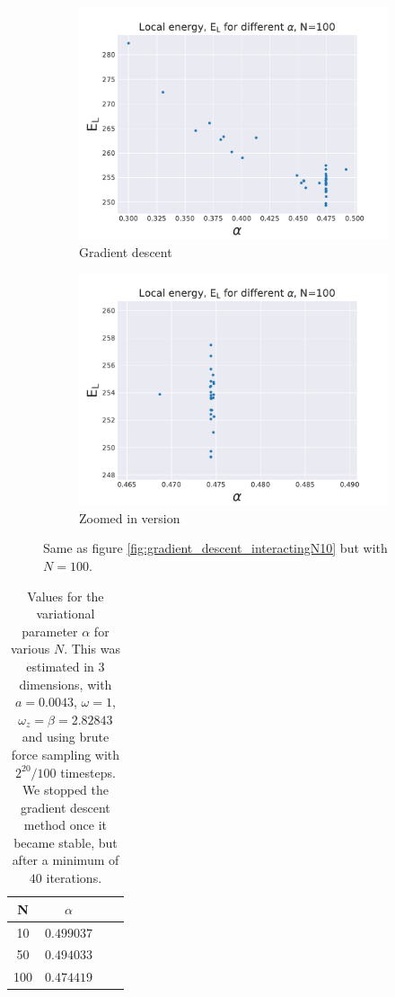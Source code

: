 \documentclass[a4paper, 10pt]{article}
\begin{document}
		\begin{figure}[ht!]
			\centering
			\centering
			\begin{subfigure}{.5\textwidth}
				\centering
				\includegraphics[width=.8\linewidth]{../Results/E_v_alpha_gradientN100.pdf}
				\caption{Gradient descent}
			\end{subfigure}%
			\begin{subfigure}{.5\textwidth}
				\centering
				\includegraphics[width=.8\linewidth]{../Results/E_v_alpha_gradientN100Zoom.pdf}
				\caption{Zoomed in version}
			\end{subfigure}
			\caption{Same as figure \ref{fig:gradient_descent_interactingN10} but with $N=100$. }\label{fig:gradient_descent_interactingN100}
		\end{figure}
		
			\begin{table}[ht!]
				\centering
				\begin{tabular}{cccc}
					N & $\alpha$\\
					\hline
					10 & $0.499037$\\
					50 &$0.494033$\\ 
					100 & $0.474419$
				\end{tabular}
				\caption{Values for the variational parameter $\alpha$ for various $N$. This was estimated in 3 dimensions, with $a=0.0043$, $\omega=1$, $\omega_z=\beta=2.82843$ and using brute force sampling with $2^{20}/100$ timesteps. We stopped the gradient descent method once it became stable, but after a minimum of $40$ iterations.}\label{tab:correct_alpha_interacting}
		\end{table}
\end{document}
